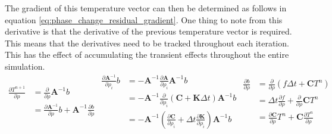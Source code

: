   The gradient of this temperature vector can then be determined as follows in equation \ref{eq:phase_change_residual_gradient}. One thing to note from this derivative is that the derivative of the previous temperature vector is required. This means that the derivatives need to be tracked throughout each iteration. This has the effect of accumulating the transient effects throughout the entire simulation.
  \begin{subequations}
    \begin{equation}
      \begin{split}
        \frac{\partial T^{n+1}}{\partial\rho} &= \frac{\partial}{\partial\rho}\mathbf{A}^{-1}b \\
        &= \frac{\partial\mathbf{A}^{-1}}{\partial\rho}b + \mathbf{A}^{-1}\frac{\partial b}{\partial\rho}
      \end{split}
    \end{equation}
    \begin{equation}
      \begin{split}
        \frac{\partial\mathbf{A}^{-1}}{\partial\rho_i}b &= -\mathbf{A}^{-1}\frac{\partial\mathbf{A}}{\partial\rho_i}\mathbf{A}^{-1}b \\
        &= -\mathbf{A}^{-1}\frac{\partial}{\partial\rho_i}(\mathbf{C} + \mathbf{K}\Delta t)\mathbf{A}^{-1}b \\
        &= -\mathbf{A}^{-1}\left(\frac{\partial\mathbf{C}}{\partial\rho_i} + \Delta t\frac{\partial\mathbf{K}}{\partial\rho_i}\right)\mathbf{A}^{-1}b
      \end{split}
    \end{equation}
    \begin{equation}
      \begin{split}
        \frac{\partial b}{\partial\rho} &= \frac{\partial}{\partial\rho}(f\Delta t + \mathbf{C}T^n) \\
        &= \Delta t\frac{\partial f}{\partial\rho} + \frac{\partial}{\partial\rho}\mathbf{C}T^n \\
        &= \frac{\partial\mathbf{C}}{\partial\rho}T^n + \mathbf{C}\frac{\partial T^n}{\partial\rho}
      \end{split}
    \end{equation}
    \label{eq:phase_change_residual_gradient}
  \end{subequations}
  
  

